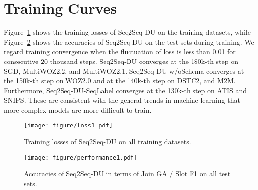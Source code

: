\documentclass[11pt]{article}
\begin{document}
\clearpage

\appendix




\section{Training Curves}
\label{sec:training_curves}

Figure~\ref{fig:loss} shows the training losses of Seq2Seq-DU on the training datasets, while Figure~\ref{fig:performance} shows the accuracies of Seq2Seq-DU on the test sets during training. We regard training convergence when the fluctuation of loss is less than 0.01 for consecutive 20 thousand steps. Seq2Seq-DU converges at the 180k-th step on SGD, MultiWOZ2.2, and MultiWOZ2.1. Seq2Seq-DU-w/oSchema converges at the 150k-th step on WOZ2.0 and at the 140k-th step on DSTC2, and M2M. Furthermore, Seq2Seq-DU-SeqLabel converges at the 130k-th step on ATIS and SNIPS. These are consistent with the general trends in machine learning that more complex models are more difficult to train. 

\begin{figure}[h]
\centering
\texttt{[image: figure/loss1.pdf]}
\caption{Training losses of Seq2Seq-DU on all training datasets.}
\label{fig:loss}
\end{figure}

\begin{figure}[h]
\centering
\texttt{[image: figure/performance1.pdf]}
\caption{Accuracies of Seq2Seq-DU in terms of Join GA / Slot F1 on all test sets.}
\label{fig:performance}
\end{figure}
\end{document}

